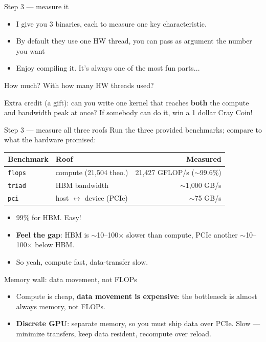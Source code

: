 \begin{frame}{Step 3 --- measure it}

\begin{itemize}
    \item I give you 3 binaries, each to measure one key characteristic.
    \item By default they use one HW thread, you can pass as argument the number you want
    \item  Enjoy compiling it. It's always one of the most fun parts...
\end{itemize}

How much? With how many HW threads used?

\medskip

Extra credit (a gift): can you write one kernel that reaches
\textbf{both} the compute and bandwidth peak at once? If somebody can do it, win a 1 dollar Cray Coin!

\end{frame}


\begin{frame}{Step 3 --- measure all three roofs}
Run the three provided benchmarks; compare to what the hardware promised:
\begin{center}
\begin{tabular}{@{}llr@{}}
\toprule
\textbf{Benchmark} & \textbf{Roof} & \textbf{Measured} \\
\midrule
\texttt{flops} & compute (21{,}504 theo.) & \alert{21{,}427 GFLOP/s} ($\sim$99.6\%) \\
\texttt{triad} & HBM bandwidth            & \alert{$\sim$1{,}000 GB/s} \\
\texttt{pci}   & host $\leftrightarrow$ device (PCIe) & \alert{$\sim$75 GB/s} \\
\bottomrule
\end{tabular}
\end{center}
\medskip
\begin{itemize}
    \item  99\% for HBM. Easy!
    \item \textbf{Feel the gap}: HBM is $\sim$10--100$\times$ slower than compute,
          PCIe another $\sim$10--100$\times$ below HBM.
    \item  So yeah, compute fast, data-transfer slow.

\end{itemize}
\end{frame}

\begin{frame}{Memory wall: data movement, not FLOPs}
\begin{itemize}
    \item Compute is cheap, \textbf{data movement is expensive}: the bottleneck is
          almost always memory, not FLOPs.
    \item \textbf{Discrete GPU}: separate memory, so you must ship data over PCIe.
          Slow --- minimize transfers, keep data resident, recompute over reload.
\end{itemize}
\end{frame}

